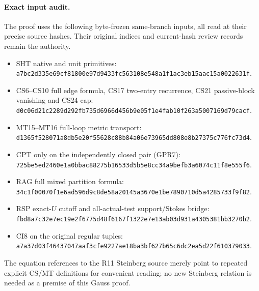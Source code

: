 \paragraph{Exact input audit.}
The proof uses the following byte-frozen same-branch inputs, all
read at their precise source hashes.  Their original indices and
current-hash review records remain the authority.
\begin{itemize}
\item SHT native and unit primitives:
\texttt{a7bc2d335e69cf81800e97d9433fc563108e548a1f1ac3eb15aac15a0022631f}.
\item CS6--CS10 full edge formula, CS17 two-entry recurrence,
CS21 passive-block vanishing and CS24 cap:
\texttt{d0c06d21c2289d292fb735d6966d456b9e05f1e4fab10f263a5007169d79cacf}.
\item MT15--MT16 full-loop metric transport:
\texttt{d1365f528071a8db5e20f55628c88b84a06e73965dd808e8b27375c776fc73d4}.
\item CPT only on the independently closed pair (GPR7):
\texttt{725be5ed2460e1a0bbac88275b16533d5b5e8cc34a9befb3a6074c11f8e555f6}.
\item RAG full mixed partition formula:
\texttt{34c1f00070f1e6ad596d9c8de58a20145a3670e1be7890710d5a4285733f9f82}.
\item RSP exact-$U$ cutoff and all-actual-test support/Stokes bridge:
\texttt{fbd8a7c32e7ec19e2f6775d48f6167f1322e7e13ab03d931a4305381bb3270b2}.
\item CI8 on the original regular tuples:
\texttt{a7a37d03f46437047aaf3cfe9227ae18ba3bf627b65c6dc2ea5d22f610379033}.
\end{itemize}
The equation references to the R11 Steinberg source merely point
to repeated explicit CS/MT definitions for convenient reading;
no new Steinberg relation is needed as a premise of this Gauss proof.
